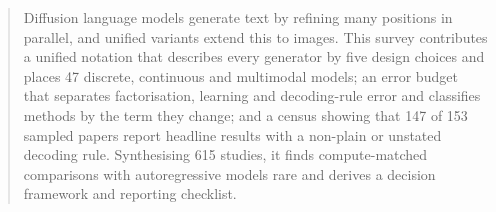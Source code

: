 \documentclass[acmsmall,screen]{acmart}
\begin{document}
\begin{abstract}
Diffusion language models generate text by refining many positions in parallel, and unified variants extend this to images. This survey contributes a unified notation that describes every generator by five design choices and places 47 discrete, continuous and multimodal models; an error budget that separates factorisation, learning and decoding-rule error and classifies methods by the term they change; and a census showing that 147 of 153 sampled papers report headline results with a non-plain or unstated decoding rule. Synthesising 615 studies, it finds compute-matched comparisons with autoregressive models rare and derives a decision framework and reporting checklist.
\end{abstract}

\end{document}
